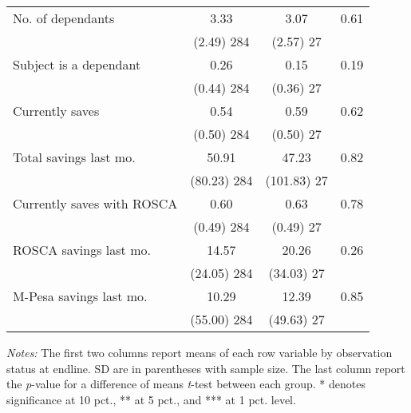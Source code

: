 \begin{table}[htbp]
{\begin{threeparttable}
\begin{tabular}{l*{3}{c}}
No. of dependants&     3.33&     3.07&     0.61\\
          &(2.49) 284 &(2.57) 27 &         \\
Subject is a dependant&     0.26&     0.15&     0.19\\
          &(0.44) 284 &(0.36) 27 &         \\
Currently saves&     0.54&     0.59&     0.62\\
          &(0.50) 284 &(0.50) 27 &         \\
Total savings last mo.&    50.91&    47.23&     0.82\\
          &(80.23) 284 &(101.83) 27 &         \\
Currently saves with ROSCA&     0.60&     0.63&     0.78\\
          &(0.49) 284 &(0.49) 27 &         \\
ROSCA savings last mo.&    14.57&    20.26&     0.26\\
          &(24.05) 284 &(34.03) 27 &         \\
M-Pesa savings last mo.&    10.29&    12.39&     0.85\\
          &(55.00) 284 &(49.63) 27 &         \\
\bottomrule \end{tabular} \begin{tablenotes}[flushleft] \footnotesize \item \emph{Notes:} The first two columns report means of each row variable by observation status at endline. SD are in parentheses with sample size. The last column report the \emph{p}-value for a difference of means \emph{t}-test between each group. * denotes significance at 10 pct., ** at 5 pct., and *** at 1 pct. level. \end{tablenotes} \end{threeparttable} } \end{table}
